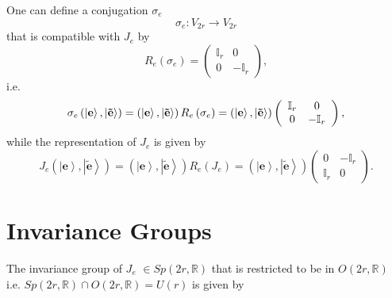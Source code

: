 \documentclass[aps,preprint]{revtex4}
\begin{document}
One can define a conjugation $\sigma_{e}$ 
\begin{equation}
\sigma_{e}:V_{2r}\rightarrow V_{2r}
\end{equation}
that is compatible with $J_{e}$ by 
\begin{equation}
R_{e}\left( \sigma_{e}\right) =\left( 
\begin{array}{cc}
\mathbb{I}_{r} & 0 \\ 
0 & -\mathbb{I}_{r}%
\end{array}
\right) ,
\end{equation}
i.e. 
\begin{equation}
\sigma_{e}\left( \left\vert \mathbf{e}\right\rangle ,\left\vert \mathbf{%
\tilde{e}}\right\rangle \right) =\left( \left\vert \mathbf{e}\right\rangle
,\left\vert \mathbf{\tilde{e}}\right\rangle \right) R_{e}\left(
\sigma_{e}\right) =\left( \left\vert \mathbf{e}\right\rangle ,\left\vert 
\mathbf{\tilde{e}}\right\rangle \right) \left( 
\begin{array}{cc}
\mathbb{I}_{r} & 0 \\ 
0 & -\mathbb{I}_{r}%
\end{array}
\right) ,
\end{equation}
while the representation of $J_{e}$ is given by%
\begin{equation}
J_{e}\left( \left\vert \mathbf{e}\right\rangle ,\left\vert \mathbf{\tilde{e}}%
\right\rangle \right) =\left( \left\vert \mathbf{e}\right\rangle ,\left\vert 
\mathbf{\tilde{e}}\right\rangle \right) R_{e}\left( J_{e}\right) =\left(
\left\vert \mathbf{e}\right\rangle ,\left\vert \mathbf{\tilde{e}}%
\right\rangle \right) \left( 
\begin{array}{cc}
0 & -\mathbb{I}_{r} \\ 
\mathbb{I}_{r} & 0%
\end{array}
\right) .
\end{equation}

\section{Invariance Groups}

The invariance group of $J_{e}$ $\in Sp\left( 2r,\mathbb{R}\right) $ that is
restricted to be in $O\left( 2r,\mathbb{R}\right) $ i.e. $Sp\left( 2r,%
\mathbb{R}\right) \cap O\left( 2r,\mathbb{R}\right) =U\left( r\right) $ is
given by
\end{document}
